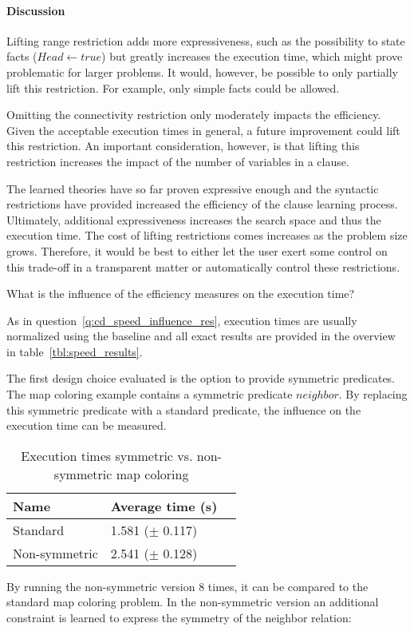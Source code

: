 \paragraph{Discussion}

Lifting range restriction adds more expressiveness, such as the possibility to state facts ($Head \leftarrow true$) but greatly increases the execution time, which might prove problematic for larger problems.
It would, however, be possible to only partially lift this restriction.
For example, only simple facts could be allowed.

Omitting the connectivity restriction only moderately impacts the efficiency.
Given the acceptable execution times in general, a future improvement could lift this restriction.
An important consideration, however, is that lifting this restriction increases the impact of the number of variables in a clause.

The learned theories have so far proven expressive enough and the syntactic restrictions have provided increased the efficiency of the clause learning process.
Ultimately, additional expressiveness increases the search space and thus the execution time.
The cost of lifting restrictions comes increases as the problem size grows.
Therefore, it would be best to either let the user exert some control on this trade-off in a transparent matter or automatically control these restrictions.

\begin{question}
	What is the influence of the efficiency measures on the execution time?
\end{question}

As in question~\ref{q:cd_speed_influence_res}, execution times are usually normalized using the baseline and all exact results are provided in the overview in table~\ref{tbl:speed_results}.

\begin{experiment}
	The first design choice evaluated is the option to provide symmetric predicates.
	The map coloring example contains a symmetric predicate $\mathit{neighbor}$.
	By replacing this symmetric predicate with a standard predicate, the influence on the execution time can be measured.

	\begin{table}[!htp]
		\begin{tabularx}{\textwidth}{XXX}
			\textbf{Name}	& \textbf{Average time (s)}	 \\
			\toprule
			Standard 		& 1.581 ($\pm$ 0.117) \\
			Non-symmetric 	& 2.541 ($\pm$ 0.128) \\
		\end{tabularx}
		\caption{Execution times symmetric vs. non-symmetric map coloring}
		\label{tbl:exp_speed_symm}
	\end{table}

	By running the non-symmetric version $8$ times, it can be compared to the standard map coloring problem.
	In the non-symmetric version an additional constraint is learned to express the symmetry of the neighbor relation: 
\end{experiment}

